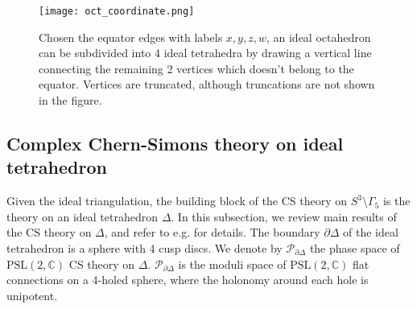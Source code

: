 \documentclass[aps,prd,notitlepage,nofootinbib,superscriptaddress,groupedaddress,twocolumn]{revtex4-1}
\newcommand{\PSlc}{\mathrm{PSL}(2,\mathbb{C})}
\newcommand{\calp}{\mathcal P}
\newcommand{\G}{\Gamma}
\begin{document}
	\begin{figure}[t]
	\begin{center}
	\texttt{[image: oct\_coordinate.png]}
	\caption{Chosen the equator edges with labels $x,y,z,w$, an ideal octahedron can be subdivided into 4 ideal tetrahedra by drawing a vertical line connecting the remaining 2 vertices which doesn't belong to the equator. Vertices are truncated, although truncations are not shown in the figure. }
	\label{oct_coordinate}
	\end{center}
	\end{figure}



\subsection{Complex Chern-Simons theory on ideal tetrahedron}\label{Complex Chern-Simons theory on ideal tetrahedron}


Given the ideal triangulation, the building block of the CS theory on $S^3\setminus\G_5$ is the theory on an ideal tetrahedron $\Delta$. In this subsection, we review main results of the CS theory on $\Delta$, and refer to e.g. \cite{Dimofte2011,DGV,levelk} for details. The boundary $\partial\Delta$ of the ideal tetrahedron is a sphere with 4 cusp discs. We denote by $\calp_{\partial\Delta}$ the phase space of $\PSlc$ CS theory on $\Delta$. $\mathcal{P}_{\partial\Delta}$ is the moduli space of $\PSlc$ flat connections on a 4-holed sphere, where the holonomy around each hole is unipotent. 
\end{document}
